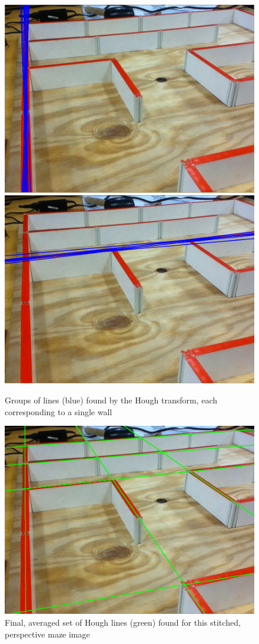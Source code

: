 \documentclass[10pt,twocolumn,letterpaper]{article}
\begin{document}
\begin{figure}[h!]
\begin{center}
	\includegraphics[width=0.8\linewidth]{images/houghlines1.png}
	\includegraphics[width=0.8\linewidth]{images/houghlines2.png}
\end{center}
\caption{Groups of lines (blue) found by the Hough transform, each corresponding to a single wall}
\label{fig:houghgroups}
\end{figure}


\begin{figure}[h!]
\begin{center}
		\includegraphics[width=0.8\linewidth]{images/houghlinesfinal.png}
\end{center}
\caption{Final, averaged set of Hough lines (green) found for this stitched, perspective maze image}
\label{fig:houghfinal}	
\end{figure}
\end{document}
